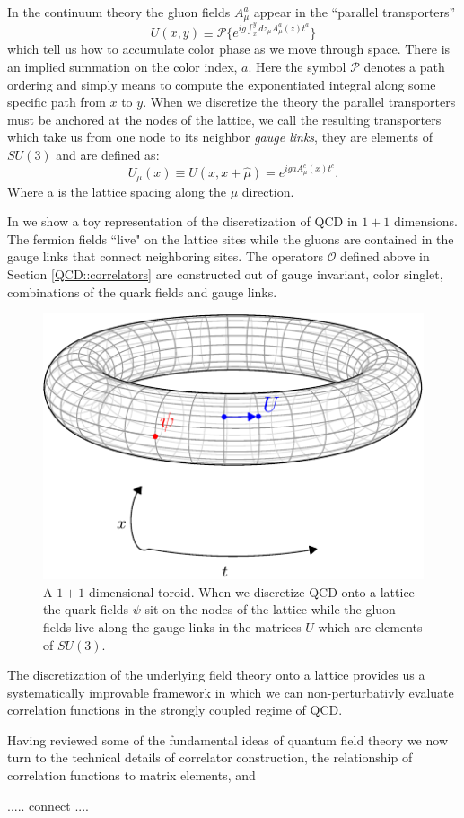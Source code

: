 In the continuum theory the gluon fields $A^a_\mu$ appear in the ``parallel transporters'' 
\begin{equation*}
U(x,y) \equiv \mathcal{P}\{e^{ig \int_x^y dz_\mu A^a_\mu(z) t^a }\}
\end{equation*} 
which tell us how to accumulate color phase as we move through space. There is an implied summation on the color index, $a$. Here the symbol $\mathcal{P}$ denotes a path ordering and simply means to compute the exponentiated integral along some specific path from $x$ to $y$. When we discretize the theory the parallel transporters must be anchored at the nodes of the lattice, we call the resulting transporters which take us from one node to its neighbor \emph{gauge links}, they are elements of $SU(3)$ and are defined as: 
\begin{equation*}
U_\mu(x) \equiv U(x,x+\hat{\mu}) =  e^{ig a A^c_\mu(x) t^c }. 
\end{equation*} 
Where a is the lattice spacing along the $\mu$ direction. 

In  we show a toy representation of the discretization of QCD in $1+1$ dimensions. The fermion fields ``live" on the lattice sites while the gluons are contained in the gauge links that connect neighboring sites. The operators $\mathcal{O}$ defined above in Section \ref{QCD::correlators} are constructed out of gauge invariant, color singlet, combinations of the quark fields and gauge links. 

\begin{figure}[htbp]
\centering
\includegraphics[width=0.8\linewidth]{figures/lattice_toroid_fields/lattice_toroid_fields.pdf}
\caption{ A $1+1$ dimensional toroid. When we discretize QCD onto a lattice the quark fields $\psi$ sit on the nodes of the lattice while the gluon fields live along the gauge links in the matrices $U$ which are elements of $SU(3)$. \label{fig::QCD_1p1_lattice_fields}}
\end{figure}

The discretization of the underlying field theory onto a lattice provides us a systematically improvable framework in which we can non-perturbativly evaluate correlation functions in the strongly coupled regime of QCD.

Having reviewed some of the fundamental ideas of quantum field theory we now turn to the technical details of correlator construction, the relationship of correlation functions to matrix elements, and 


..... connect .... 
